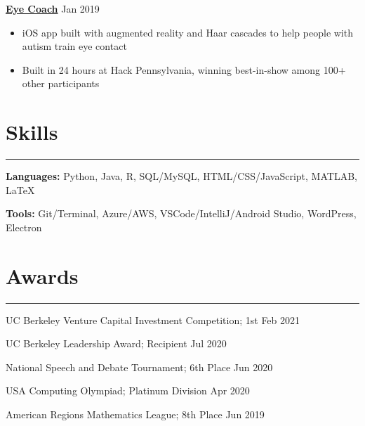 \documentclass[11pt]{article}
\newcommand{\resumesection}[1]{\vspace{-0.6cm}\section*{\color{highlight}#1}\vspace{-0.3cm}\hrule\vspace{0.2cm}}
\begin{document}
\textbf{\href{https://github.com/gautomdas/eye-coach}{Eye Coach}} \hfill Jan 2019 \par
\begin{itemize}
	\item iOS app built with augmented reality and Haar cascades to help people with autism train eye contact
	\item Built in 24 hours at Hack Pennsylvania, winning best-in-show among 100+ other participants
\end{itemize}\vspace{0.1cm} \par

\resumesection{Skills}

\textbf{Languages:} Python, Java, R, SQL/MySQL, HTML/CSS/JavaScript, MATLAB, \LaTeX \par
\textbf{Tools:} Git/Terminal, Azure/AWS, VSCode/IntelliJ/Android Studio, WordPress, Electron

\resumesection{Awards}

UC Berkeley Venture Capital Investment Competition; 1st \hfill Feb 2021\par
UC Berkeley Leadership Award; Recipient \hfill Jul 2020 \par
National Speech and Debate Tournament; 6th Place \hfill Jun 2020 \par
USA Computing Olympiad; Platinum Division \hfill Apr 2020 \par
American Regions Mathematics League; 8th Place \hfill Jun 2019 \par
\end{document}
